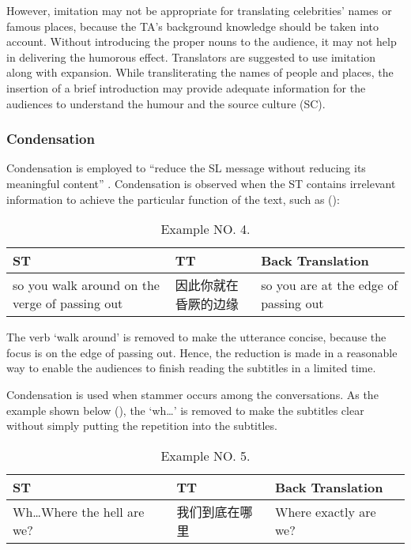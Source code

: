 \documentclass[english]{textolivre}
\begin{document}
However, imitation may not be appropriate for translating celebrities' names or famous places, because the TA's background knowledge should be taken into account. Without introducing the proper nouns to the audience, it may not help in delivering the humorous effect. Translators are suggested to use imitation along with expansion. While transliterating the names of people and places, the insertion of a brief introduction may provide adequate information for the audiences to understand the humour and the source culture (SC). 

\subsubsection{Condensation}
Condensation is employed to “reduce the SL message without reducing its meaningful content” \cite[p. 168]{gottlieb_1992}. Condensation is observed when the ST contains irrelevant information to achieve the particular function of the text, such as (): 

\begin{table}[htpb]
\caption{Example NO. 4.}
\label{tbl04}
\begin{tabularx}{\linewidth}{XXX}
\toprule 
ST  & TT & Back Translation \\ 
\midrule
so you walk around on the verge of passing out  & 因此你就在昏厥的边缘  & so you are at the edge of passing out \\ 
\bottomrule
\end{tabularx}
\end{table}

The verb `walk around' is removed to make the utterance concise, because the focus is on the edge of passing out. Hence, the reduction is made in a reasonable way to enable the audiences to finish reading the subtitles in a limited time. 

Condensation is used when stammer occurs among the conversations. As the example shown below (), the `wh…' is removed to make the subtitles clear without simply putting the repetition into the subtitles.

\begin{table}[htpb]
\caption{Example NO. 5.}
\label{tbl05}
\begin{tabularx}{\linewidth}{XXX}
\toprule 
ST  & TT & Back Translation \\ 
\midrule
Wh…Where the hell are we?  & 我们到底在哪里  & Where exactly are we? \\ 
\bottomrule
\end{tabularx}
\end{table}
\end{document}
